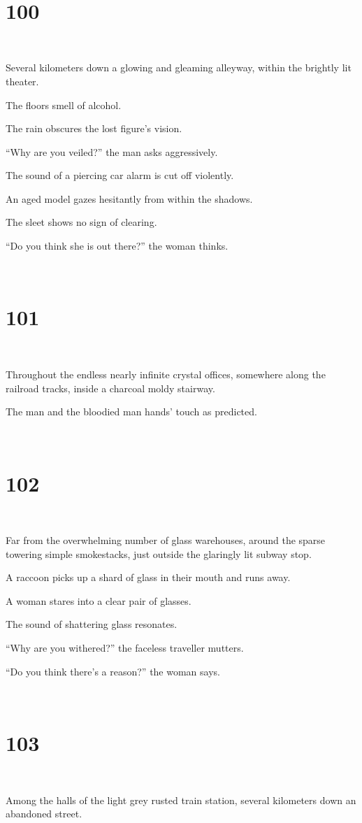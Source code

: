 \documentclass{report}
\begin{document}
~
\chapter*{100}
~

Several kilometers down a glowing and gleaming alleyway, within the brightly lit theater.

The floors smell of alcohol.

The rain obscures the lost figure's vision.

``Why are you veiled?'' the man asks aggressively.

The sound of a piercing car alarm is cut off violently.

An aged model gazes hesitantly from within the shadows.

The sleet shows no sign of clearing.

``Do you think she is out there?'' the woman thinks.

~
\chapter*{101}
~

Throughout the endless nearly infinite crystal offices, somewhere along the railroad tracks, inside a charcoal moldy stairway.

The man and the bloodied man hands' touch as predicted.

~
\chapter*{102}
~

Far from the overwhelming number of glass warehouses, around the sparse towering simple smokestacks, just outside the glaringly lit subway stop.

A raccoon picks up a shard of glass in their mouth and runs away.

A woman stares into a clear pair of glasses.

The sound of shattering glass resonates.

``Why are you withered?'' the faceless traveller mutters.

``Do you think there's a reason?'' the woman says.

~
\chapter*{103}
~

Among the halls of the light grey rusted train station, several kilometers down an abandoned street.
\end{document}

